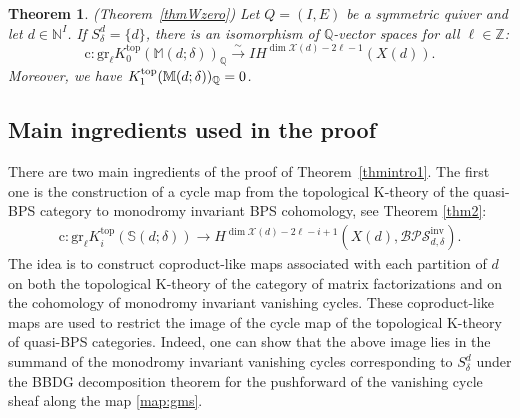 \documentclass [11pt,oneside,a4paper,mathscr]{amsart}
\newtheorem{thm}{Theorem}[section]
\theoremstyle{definition}
\newcommand{\X}{\mathscr{X}}
\newcommand{\dd}{\underline{d}}
\begin{document}
\begin{thm}\emph{(Theorem~\ref{thmWzero})}
\label{thm13zeropote}
Let $Q=(I, E)$ be a symmetric quiver
and let $d \in \mathbb{N}^I$.  
If $S_{\delta}^d=\{d\}$, 
  there is an isomorphism of $\mathbb{Q}$-vector spaces for all $\ell\in\mathbb{Z}$:
    \[\mathrm{c}\colon \mathrm{gr}_\ell K^{\mathrm{top}}_0(\mathbb{M}(d; \delta))_{\mathbb{Q}}\xrightarrow{\sim} I\!H^{\dim \X(d)-2\ell-1}(X(d)).\]
    Moreover, we have $K_1^{\rm{top}}(\mathbb{M}(d; \delta))_{\mathbb{Q}}=0$. 
\end{thm}


\subsection{Main ingredients used in the proof}
There are two main ingredients of the proof of Theorem~\ref{thmintro1}. 
The first one is 
the construction of 
a cycle map from the topological K-theory of the quasi-BPS category to monodromy invariant 
BPS cohomology, see Theorem \ref{thm2}:
 \begin{align}\label{m2.5}
   \mathrm{c}\colon \mathrm{gr}_\ell K_i^{\mathrm{top}}\left(\mathbb{S}(d; \delta)\right) \to H^{\dim\X(d)-2\ell-i+1}(X(d), \mathcal{BPS}_{d,\delta}^{\mathrm{inv}}).
\end{align}   
The idea is to construct coproduct-like maps associated with 
each partition of $d$ on both the topological K-theory of the category of matrix 
factorizations 
and on the cohomology of monodromy invariant vanishing cycles. 
These coproduct-like maps are used to restrict the image of the cycle map of the topological K-theory of quasi-BPS 
categories. Indeed,
one can show that the above image lies in the summand 
of the monodromy invariant vanishing cycles 
corresponding to $S_{\delta}^d$ under the BBDG decomposition theorem for the pushforward of the vanishing cycle sheaf along the map \eqref{map:gms}. 
\end{document}
